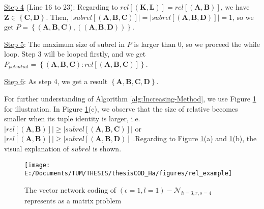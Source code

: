 \begin{example}
\uline{Step 4} (Line 16 to 23): Regarding to $rel\left[\left(\boldsymbol{K},\boldsymbol{L}\right)\right]=rel\left[\left(\boldsymbol{A},\boldsymbol{B}\right)\right]$,
we have $\boldsymbol{Z}\in\left\{ \boldsymbol{C},\boldsymbol{D}\right\} $.
Then, $\left|subrel\left[\left(\boldsymbol{A},\boldsymbol{B},\boldsymbol{C}\right)\right]\right|=\left|subrel\left[\left(\boldsymbol{A},\boldsymbol{B},\boldsymbol{D}\right)\right]\right|=1$,
so we get $P=\left\{ \left(\boldsymbol{A},\boldsymbol{B},\boldsymbol{C}\right),\left(\left(\boldsymbol{A},\boldsymbol{B},\boldsymbol{D}\right)\right)\right\} $.

\uline{Step 5}: The maximum size of subrel in $P$ is larger than
$0$, so we proceed the while loop. Step 3 will be looped firstly,
and we get $P_{potential}=\left\{ \left(\boldsymbol{A},\boldsymbol{B},\boldsymbol{C}\right):rel\left[\left(\boldsymbol{A},\boldsymbol{B},\boldsymbol{C}\right)\right]\right\} $.

\uline{Step 6}: As step 4, we get a result $\left\{ \boldsymbol{A},\boldsymbol{B},\boldsymbol{C},\boldsymbol{D}\right\} $.
\end{example}
%
\begin{example}
For further understanding of Algorithm \ref{alg:Increasing-Method},
we use Figure \ref{fig:rel_example} for illustration. In Figure \ref{fig:rel_example}(c),
we observe that the size of relative becomes smaller when its tuple
identity is larger, i.e. $\left|rel\left[\left(\boldsymbol{A},\boldsymbol{B}\right)\right]\right|\geq\left|subrel\left[\left(\boldsymbol{A},\boldsymbol{B},\boldsymbol{C}\right)\right]\right|$
or $\left|rel\left[\left(\boldsymbol{A},\boldsymbol{B}\right)\right]\right|\geq\left|subrel\left[\left(\boldsymbol{A},\boldsymbol{B},\boldsymbol{D}\right)\right]\right|$.Regarding
to Figure \ref{fig:rel_example}(a) and \ref{fig:rel_example}(b),
the visual explanation of $subrel$ is shown.
\end{example}
\begin{figure}[H]
\caption{The vector network coding of $(\epsilon=1,l=1)-\mathcal{N}_{h=3,r,s=4}$
represents as a matrix problem\label{fig:rel_example}}

\centering{}\texttt{[image: E:/Documents/TUM/THESIS/thesisCOD\_Ha/figures/rel\_example]}
\end{figure}

